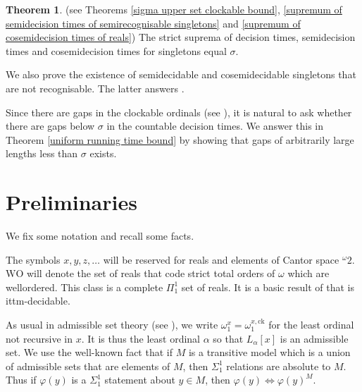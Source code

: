\documentclass[a4paper,11pt]{amsart}
\theoremstyle{definition}
\newcommand{\WO}{\mathrm{WO}}
\newcommand{\ck}{\mathrm{ck}}
\newtheorem*{theorem*}{Theorem}
\newtheorem*{problem A}{Problem 1}
\newtheorem*{problem B}{Problem 2}
\theoremstyle{remark}
\def\mb{\mbox{ }}
\begin{document}
\begin{theorem*} (see Theorems \ref{sigma upper set clockable bound}, \ref{supremum of semidecision times of semirecognisable singletons} and \ref{supremum of cosemidecision times of reals}) 
The strict suprema of decision times, semidecision times and cosemidecision times for singletons equal $\sigma$. 
\end{theorem*} 


We also prove the existence of semidecidable and cosemidecidable singletons that are not recognisable. 
The latter answers \cite[Question 4.5.5]{carl2019ordinal}. 

Since there are gaps in the clockable ordinals (see \cite{hamkins2000infinite}), it is natural to ask whether there are gaps below $\sigma$ in the countable decision times. 
We answer this in Theorem \ref{uniform running time bound} by showing that gaps of arbitrarily large lengths less than $\sigma$ exists. 




\section{Preliminaries}

We fix some notation and recall some facts. 

The symbols $x,y,z,\ldots$ will be reserved for reals and elements of Cantor space ${}^{\omega}2$. 
$\WO$ will denote the set of reals that code strict total orders of $\omega$ which are wellordered.   This class  is a complete $\Pi^{1}_{1}$ set of reals. It is a basic result of \cite[Cor. 2.3]{hamkins2000infinite} that is ittm-decidable.

As usual in admissible set theory (see \cite{Bar}), we write $\omega_{1}^{x}=\omega_{1}^{x,\ck}$ for the least ordinal not recursive in $x$. It is thus the least ordinal $\alpha$ so that $L_{\alpha}[x]$ is an admissible set. We use the well-known fact that if $M$ is a transitive model which is a union of admissible sets that are elements of $M$, then $\Sigma^{1}_{1}$ relations are absolute to $M$. Thus if $\varphi(y)$ is a $\Sigma^{1}_{1}$ statement about $y\in M$, then $\varphi(y)\Leftrightarrow \varphi(y)^{M}$. 
\end{document}
